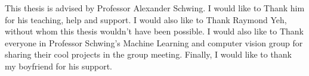 This thesis is advised by Professor Alexander Schwing. I would like to Thank him for his teaching, help and support. I would also like to Thank Raymond Yeh, without whom this thesis wouldn't have been possible. I would also like to Thank everyone in Professor Schwing's Machine Learning and computer vision group for sharing their cool projects in the group meeting. Finally, I would like to thank my boyfriend for his support.